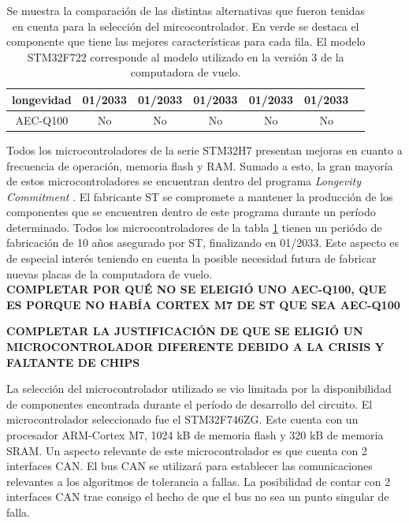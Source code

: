 \begin{table}[H]
\begin{tabular}{|c||c|c|c|c|c|c|}
        \hline
        longevidad & \cellcolor{green!25}01/2033 & \cellcolor{green!25}01/2033 & \cellcolor{green!25}01/2033 & \cellcolor{green!25}01/2033 & \cellcolor{green!25}01/2033\\
        \hline
        AEC-Q100 & No & No & No & No & No\\
        \hline       
    \end{tabular}
    \caption{Se muestra la comparación de las distintas alternativas que fueron tenidas en cuenta para la selección del mircocontrolador. En verde se destaca el componente que tiene las mejores características para cada fila. El modelo STM32F722 corresponde al modelo utilizado en la versión 3 de la computadora de vuelo.}
    \label{tab:comparacion_MCUs}
\end{table}

Todos los microcontroladores de la serie STM32H7 presentan mejoras en cuanto a frecuencia de operación, memoria flash y RAM. Sumado a esto, la gran mayoría de estos microcontroladores se encuentran dentro del programa \textit{Longevity Commitment} \cite{longevity_ST}. El fabricante ST se compromete a mantener la producción de los componentes que se encuentren dentro de este programa durante un período determinado. Todos los microcontroladores de la tabla \ref{tab:comparacion_MCUs} tienen un periódo de fabricación de 10 años asegurado por ST, finalizando en 01/2033. Este aspecto es de especial interés teniendo en cuenta la posible necesidad futura de fabricar nuevas placas de la computadora de vuelo.\\

\textbf{{\color{red} COMPLETAR POR QUÉ NO SE ELEIGIÓ UNO AEC-Q100, QUE ES PORQUE NO HABÍA CORTEX M7 DE ST QUE SEA AEC-Q100}}

\textbf{{\color{red} COMPLETAR LA JUSTIFICACIÓN DE QUE SE ELIGIÓ UN MICROCONTROLADOR DIFERENTE DEBIDO A LA CRISIS Y FALTANTE DE CHIPS}}


La selección del microcontrolador utilizado se vio limitada por la disponibilidad de componentes encontrada durante el período de desarrollo del circuito. El microcontrolador seleccionado fue el STM32F746ZG. Este cuenta con un procesador ARM-Cortex M7, 1024 kB de memoria flash y 320 kB de memoria SRAM. Un aspecto relevante de este microcontrolador es que cuenta con 2 interfaces CAN. El bus CAN se utilizará para establecer las comunicaciones relevantes a los algoritmos de tolerancia a fallas. La posibilidad de contar con 2 interfaces CAN trae consigo el hecho de que el bus no sea un punto singular de falla.

